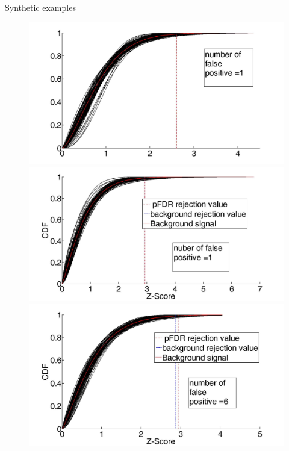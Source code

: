 \documentclass[8pt]{beamer}
\begin{document}
\begin{frame}{Synthetic examples}
\begin{figure}[H]
\end{figure}
\begin{figure}[H]
\includegraphics[scale=0.07]{randSignalZScoreDistributionWithThresh} %
\includegraphics[scale=0.07]{sineSignalZScoreDistributionWithThresh} %
\includegraphics[scale=0.07]{gaussianChainZScoreDistributionWithThresh} %
\end{figure}
\begin{figure}[H]

\end{figure}
\end{frame}
\end{document}
